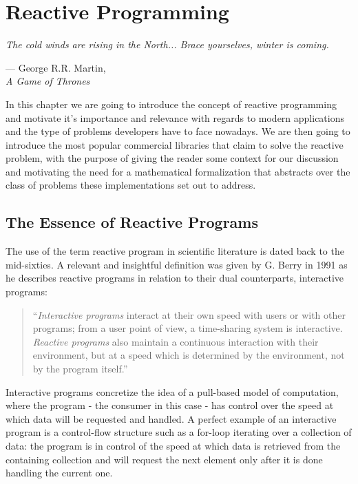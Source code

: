 \let\textcircled=\pgftextcircled
\chapter{Reactive Programming}
\label{chap:reactiveprogramming}

\epigraph{\hspace{4ex}\textit{The cold winds are rising in the North... Brace yourselves, winter is coming.}}{--- George R.R. Martin,\\ \textit{A Game of Thrones}}


In this chapter we are going to introduce the concept of reactive programming and motivate it's importance and relevance with regards to modern applications and the type of problems developers have to face nowadays. We are then going to introduce the most popular commercial libraries that claim to solve the reactive problem, with the purpose of giving the reader some context for our discussion and motivating the need for a mathematical formalization that abstracts over the class of problems these implementations set out to address.

\section{The Essence of Reactive Programs}

The use of the term reactive program in scientific literature is dated back to the mid-sixties\cite{scopus-reactive}. A relevant and insightful definition was given by G. Berry in 1991\cite{berry1991reactive} as he describes reactive programs in relation to their dual counterparts, interactive programs:

\begin{quote}
\hspace{4ex}``\textit{Interactive programs} interact at their own speed with users or with other programs; from a user point of view, a time-sharing system is interactive. \textit{Reactive programs} also maintain a continuous interaction with their environment, but at a speed which is determined by the environment, not by the program itself.''
\end{quote}

Interactive programs concretize the idea of a pull-based model of computation, where the program - the consumer in this case - has control over the speed at which data will be requested and handled. A perfect example of an interactive program is a control-flow structure such as a for-loop iterating over a collection of data: the program is in control of the speed at which data is retrieved from the containing collection and will request the next element only after it is done handling the current one.

